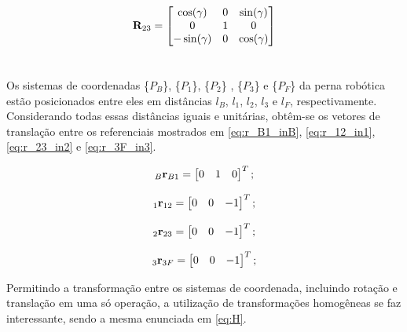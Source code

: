 \begin{equation}\label{eq:R_23}
	\mathbf{R}_{23} = \begin{bmatrix}
		\cos(\gamma) & 0 & \sin(\gamma) \\
		0            & 1 & 0            \\
		-\sin(\gamma)& 0 & \cos(\gamma)
	\end{bmatrix}
\end{equation}






\section{}

Os sistemas de coordenadas \{$P_B$\},  \{$P_1$\}, \{$P_2$\} , \{$P_3$\} e \{$P_F$\} da perna robótica estão posicionados entre eles em distâncias $l_B$, $l_1$, $l_2$, $l_3$ e $l_F$, respectivamente. Considerando todas essas distâncias iguais e unitárias, obtêm-se os vetores de translação entre os referenciais mostrados em \eqref{eq:r_B1_inB}, \eqref{eq:r_12_in1}, \eqref{eq:r_23_in2} e \eqref{eq:r_3F_in3}.

\begin{equation}\label{eq:r_B1_inB}
	_B \mathbf{r}_{B1} = \begin{bmatrix} 0 & 1 & 0 \end{bmatrix}^T;
\end{equation}


\begin{equation}\label{eq:r_12_in1}
	_1 \mathbf{r}_{12} =  \begin{bmatrix} 0 & 0 & -1 \end{bmatrix}^T;
\end{equation}


\begin{equation}\label{eq:r_23_in2}
	_2 \mathbf{r}_{23} = \begin{bmatrix} 0 & 0 & -1 \end{bmatrix}^T;
\end{equation}


\begin{equation}\label{eq:r_3F_in3}
	_3 \mathbf{r}_{3F} = \begin{bmatrix} 0 & 0 & -1 \end{bmatrix}^T;
\end{equation}

Permitindo a transformação entre os sistemas de coordenada, incluindo rotação e translação em uma só operação, a utilização de transformações homogêneas se faz interessante, sendo a mesma enunciada em \eqref{eq:H}.

